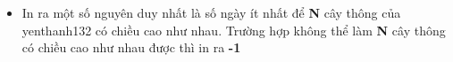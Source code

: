 \begin{itemize}
	\item In ra một số nguyên duy nhất là số ngày ít nhất để \textbf{ N } cây thông của yenthanh132 có chiều cao như nhau. Trường hợp không thể làm \textbf{ N } cây thông có chiều cao như nhau được thì in ra \textbf{ -1 }
\end{itemize}